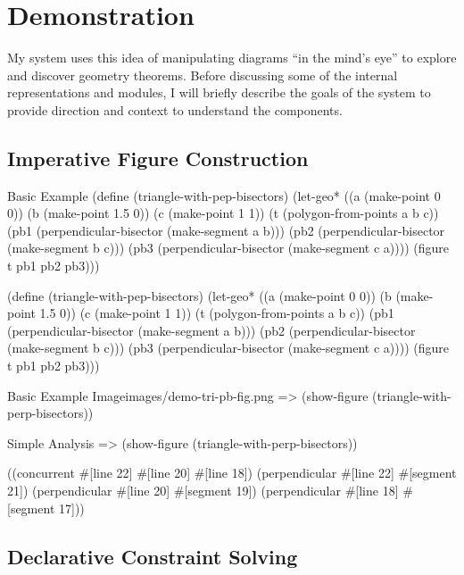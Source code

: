\chapter{Demonstration}
\label{chap:demo}

My system uses this idea of manipulating diagrams ``in the mind's
eye'' to explore and discover geometry theorems. Before discussing
some of the internal representations and modules, I will briefly
describe the goals of the system to provide direction and context to
understand the components.

\section{Imperative Figure Construction}

\begin{code-example}{Basic Example}
(define (triangle-with-pep-bisectors)
  (let-geo* ((a (make-point 0 0))
             (b (make-point 1.5 0))
             (c (make-point 1 1))
             (t (polygon-from-points a b c))
             (pb1 (perpendicular-bisector (make-segment a b)))
             (pb2 (perpendicular-bisector (make-segment b c)))
             (pb3 (perpendicular-bisector (make-segment c a))))
    (figure t pb1 pb2 pb3)))

(define (triangle-with-pep-bisectors)
  (let-geo* ((a (make-point 0 0))
             (b (make-point 1.5 0))
             (c (make-point 1 1))
             (t (polygon-from-points a b c))
             (pb1 (perpendicular-bisector (make-segment a b)))
             (pb2 (perpendicular-bisector (make-segment b c)))
             (pb3 (perpendicular-bisector (make-segment c a))))
    (figure t pb1 pb2 pb3)))
\end{code-example}

\begin{img-example}{Basic Example Image}{images/demo-tri-pb-fig.png}
=> (show-figure (triangle-with-perp-bisectors))
\end{img-example}

\begin{repl-example}{Simple Analysis}
=> (show-figure (triangle-with-perp-bisectors))

((concurrent #[line 22] #[line 20] #[line 18])
 (perpendicular #[line 22] #[segment 21])
 (perpendicular #[line 20] #[segment 19])
 (perpendicular #[line 18] #[segment 17]))
\end{repl-example}



\section{Declarative Constraint Solving}

